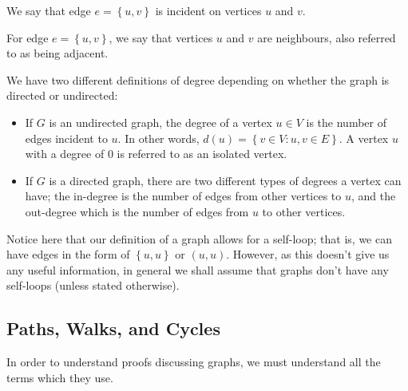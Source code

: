 \documentclass[openany]{book}
\begin{document}
\begin{defn}
	We say that edge $e=\left\{  u,v \right\}$ is incident on vertices $u$ and $v$.
\end{defn}
\begin{defn}
	For edge $e=\left\{  u,v \right\}$, we say that vertices $u$ and $v$ are neighbours, also referred to as being adjacent.
\end{defn}
\begin{defn}[Degree]
	We have two different definitions of degree depending on whether the graph is directed or undirected:
	
	\begin{itemize}
		\item If $G$ is an undirected graph, the degree of a vertex $u \in V$ is the number of edges incident to $u$. In other words, $d(u) = \left\{  v \in V : {u,v} \in E \right\}$. A vertex $u$ with a degree of $0$ is referred to as an isolated vertex.
		
		\item If $G$ is a directed graph, there are two different types of degrees a vertex can have; the in-degree is the number of edges from other vertices to $u$, and the out-degree which is the number of edges from $u$ to other vertices.
	\end{itemize}
\end{defn}
\begin{rmk}
	Notice here that our definition of a graph allows for a self-loop; that is, we can have edges in the form of $\left\{  u,u \right\}$ or $(u,u)$. However, as this doesn't give us any useful information, in general we shall assume that graphs don't have any self-loops (unless stated otherwise).
\end{rmk}
\subsection{Paths, Walks, and Cycles}
In order to understand proofs discussing graphs, we must understand all the terms which they use.
\end{document}
